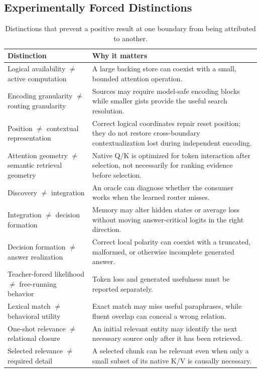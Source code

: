 \documentclass[10pt,a4paper]{article}
\begin{document}
\subsection{Experimentally Forced Distinctions}
\begin{table}[htbp]
\centering\small
\caption{Distinctions that prevent a positive result at one boundary from being attributed
to another.}
\begin{tabular}{>{\raggedright\arraybackslash}p{4.1cm}>{\raggedright\arraybackslash}p{10.2cm}}
\toprule
Distinction & Why it matters \\\midrule
Logical availability $\ne$ active computation & A large backing store can coexist with a
small, bounded attention operation. \\
Encoding granularity $\ne$ routing granularity & Sources may require model-safe encoding
blocks while smaller gists provide the useful search resolution. \\
Position $\ne$ contextual representation & Correct logical coordinates repair reset position;
they do not restore cross-boundary contextualization lost during independent encoding. \\
Attention geometry $\ne$ semantic retrieval geometry & Native Q/K is optimized for token
interaction after selection, not necessarily for ranking evidence before selection. \\
Discovery $\ne$ integration & An oracle can diagnose whether the consumer works when the
learned router misses. \\
Integration $\ne$ decision formation & Memory may alter hidden states or average loss without
moving answer-critical logits in the right direction. \\
Decision formation $\ne$ answer realization & Correct local polarity can coexist with a
truncated, malformed, or otherwise incomplete generated answer. \\
Teacher-forced likelihood $\ne$ free-running behavior & Token loss and generated usefulness
must be reported separately. \\
Lexical match $\ne$ behavioral utility & Exact match may miss useful paraphrases, while fluent
overlap can conceal a wrong relation. \\
One-shot relevance $\ne$ relational closure & An initial relevant entity may identify the next
necessary source only after it has been retrieved. \\
Selected relevance $\ne$ required detail & A selected chunk can be relevant even when only a
small subset of its native K/V is causally necessary. \\
\bottomrule
\end{tabular}
\end{table}
\end{document}
